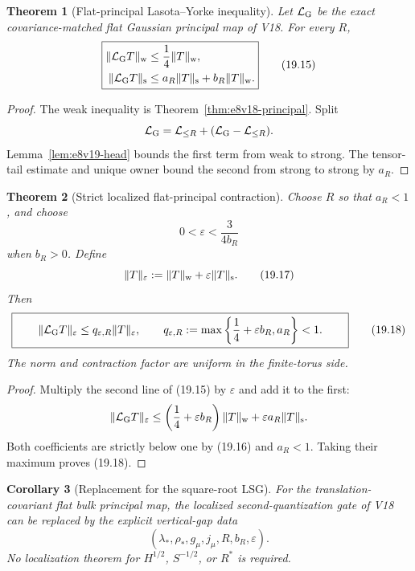 \documentclass[11pt,oneside]{book}
\newtheorem{theorem}{Theorem}[chapter]
\newtheorem{corollary}[theorem]{Corollary}
\theoremstyle{definition}
\theoremstyle{remark}
\begin{document}
\begin{theorem}[Flat-principal Lasota--Yorke inequality]
\label{thm:e8v19-lasota}
Let \(\mathcal L_{\rm G}\) be the exact covariance-matched flat
Gaussian principal map of V18.  For every \(R\),
\[
\boxed{
\begin{aligned}
\|\mathcal L_{\rm G}T\|_{\rm w}
 &\leq\frac14\|T\|_{\rm w},\\
\|\mathcal L_{\rm G}T\|_{\rm s}
 &\leq a_R\|T\|_{\rm s}+b_R\|T\|_{\rm w}.
\end{aligned}}                                                     \tag{19.15}
\]
\end{theorem}

\begin{proof}
The weak inequality is Theorem~\ref{thm:e8v18-principal}.  Split
\[
\mathcal L_{\rm G}
=\mathcal L_{\leq R}
 +(\mathcal L_{\rm G}-\mathcal L_{\leq R}).
\]
Lemma~\ref{lem:e8v19-head} bounds the first term from weak to strong.
The tensor-tail estimate and unique owner bound the second from strong
to strong by \(a_R\).
\end{proof}

\begin{theorem}[Strict localized flat-principal contraction]
\label{thm:e8v19-contraction}
Choose \(R\) so that \(a_R<1\), and choose
\[
       0<\varepsilon<\frac{3}{4b_R}                \tag{19.16}
\]
when \(b_R>0\).  Define
\[
                  \|T\|_\varepsilon
 :=\|T\|_{\rm w}+\varepsilon\|T\|_{\rm s}.          \tag{19.17}
\]
Then
\[
\boxed{\qquad
\|\mathcal L_{\rm G}T\|_\varepsilon
\leq q_{\varepsilon,R}\|T\|_\varepsilon,\qquad
q_{\varepsilon,R}:=
\max\left\{\frac14+\varepsilon b_R,a_R\right\}<1.
\qquad}                                             \tag{19.18}
\]
The norm and contraction factor are uniform in the finite-torus side.
\end{theorem}

\begin{proof}
Multiply the second line of (19.15) by \(\varepsilon\) and add it to
the first:
\[
\|\mathcal L_{\rm G}T\|_\varepsilon
\leq
\left(\frac14+\varepsilon b_R\right)\|T\|_{\rm w}
+\varepsilon a_R\|T\|_{\rm s}.
\]
Both coefficients are strictly below one by (19.16) and \(a_R<1\).
Taking their maximum proves (19.18).
\end{proof}

\begin{corollary}[Replacement for the square-root LSG]
\label{cor:e8v19-lsg}
For the translation-covariant flat bulk principal map, the localized
second-quantization gate of V18 can be replaced by the explicit
vertical-gap data
\[
  (\lambda_*,\rho_*,g_\mu,j_\mu,R,b_R,\varepsilon).
\]
No localization theorem for \(H^{1/2}\), \(S^{-1/2}\), or \(R^*\) is
required.
\end{corollary}
\end{document}
